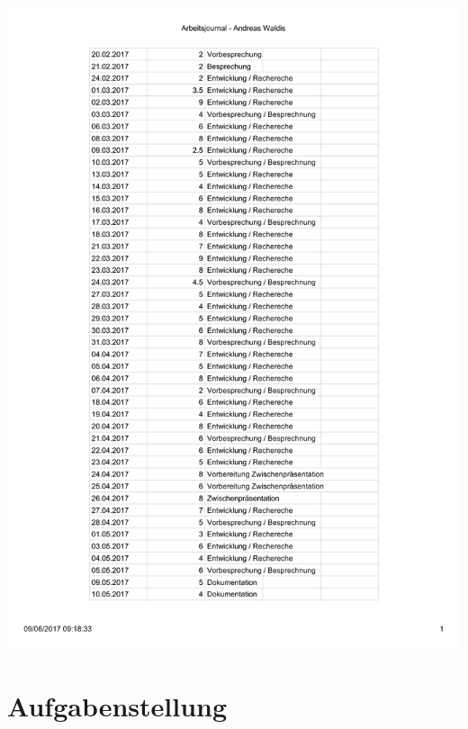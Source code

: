 \includegraphics[page=4,scale=0.8]{bilder/Arbeitsjournal.pdf}

\section{Aufgabenstellung}
\label{aufgabenstellung}

